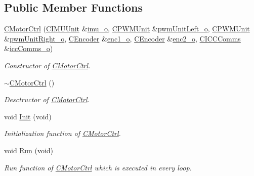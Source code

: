 \subsection*{Public Member Functions}
\begin{DoxyCompactItemize}
\item 
\mbox{\hyperlink{class_c_motor_ctrl_ae51b58d3d46f718599ae4971fad86749}{C\+Motor\+Ctrl}} (\mbox{\hyperlink{class_c_i_m_u_unit}{C\+I\+M\+U\+Unit}} \&\mbox{\hyperlink{_a_d_a_s___m_c_u_8ino_ae51e36f83228f859afeb8a72e60339a6}{imu\+\_\+o}}, \mbox{\hyperlink{class_c_p_w_m_unit}{C\+P\+W\+M\+Unit}} \&\mbox{\hyperlink{_a_d_a_s___m_c_u_8ino_a10a570a59ef56c08699c4fec61d47d16}{pwm\+Unit\+Left\+\_\+o}}, \mbox{\hyperlink{class_c_p_w_m_unit}{C\+P\+W\+M\+Unit}} \&\mbox{\hyperlink{_a_d_a_s___m_c_u_8ino_a49af1ef8724d9cb785e37641bb0cdc6b}{pwm\+Unit\+Right\+\_\+o}}, \mbox{\hyperlink{class_c_encoder}{C\+Encoder}} \&\mbox{\hyperlink{_a_d_a_s___m_c_u_8ino_ad90699f8fbb0fa8f734ae5c30885ee3b}{enc1\+\_\+o}}, \mbox{\hyperlink{class_c_encoder}{C\+Encoder}} \&\mbox{\hyperlink{_a_d_a_s___m_c_u_8ino_a54cfc96aae4913b87ab356a0665557a5}{enc2\+\_\+o}}, \mbox{\hyperlink{class_c_i_c_c_comms}{C\+I\+C\+C\+Comms}} \&\mbox{\hyperlink{_a_d_a_s___m_c_u_8ino_a62ef6b3308259edb69af585549178324}{icc\+Comms\+\_\+o}})
\begin{DoxyCompactList}\small\item\em Constructor of \mbox{\hyperlink{class_c_motor_ctrl}{C\+Motor\+Ctrl}}. \end{DoxyCompactList}\item 
\mbox{\hyperlink{class_c_motor_ctrl_a97e5fbdf11c6562a7895cf4079003132}{$\sim$\+C\+Motor\+Ctrl}} ()
\begin{DoxyCompactList}\small\item\em Desctructor of \mbox{\hyperlink{class_c_motor_ctrl}{C\+Motor\+Ctrl}}. \end{DoxyCompactList}\item 
void \mbox{\hyperlink{class_c_motor_ctrl_af4b1bec8e07e766aa2537d966f025e7a}{Init}} (void)
\begin{DoxyCompactList}\small\item\em Initialization function of \mbox{\hyperlink{class_c_motor_ctrl}{C\+Motor\+Ctrl}}. \end{DoxyCompactList}\item 
void \mbox{\hyperlink{class_c_motor_ctrl_a63e5dd36be027fe8a5e1acee5c1322c8}{Run}} (void)
\begin{DoxyCompactList}\small\item\em Run function of \mbox{\hyperlink{class_c_motor_ctrl}{C\+Motor\+Ctrl}} which is executed in every loop. \end{DoxyCompactList}\item 

\end{DoxyCompactItemize}
